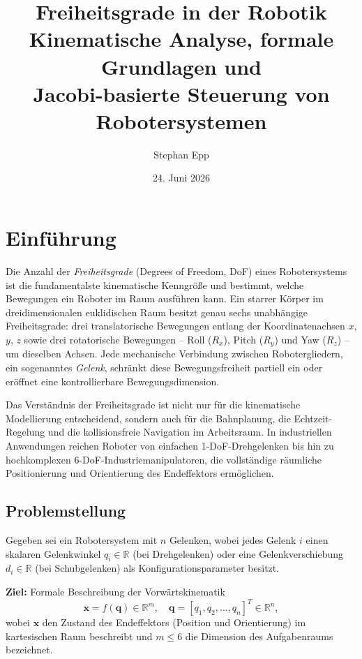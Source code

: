 ﻿\documentclass[a4paper,12pt]{article}
\title{\textbf{Freiheitsgrade in der Robotik}\\
\large Kinematische Analyse, formale Grundlagen und \\
Jacobi-basierte Steuerung von Robotersystemen}
\author{Stephan Epp}
\date{24. Juni 2026}
\theoremstyle{definition}
\begin{document}
\maketitle
\tableofcontents
\newpage

\section{Einführung}

Die Anzahl der \emph{Freiheitsgrade} (Degrees of Freedom, DoF) eines Robotersystems ist die fundamentalste kinematische Kenngröße und bestimmt, welche Bewegungen ein Roboter im Raum ausführen kann. Ein starrer Körper im dreidimensionalen euklidischen Raum besitzt genau sechs unabhängige Freiheitsgrade: drei translatorische Bewegungen entlang der Koordinatenachsen $x$, $y$, $z$ sowie drei rotatorische Bewegungen -- Roll ($R_x$), Pitch ($R_y$) und Yaw ($R_z$) -- um dieselben Achsen. Jede mechanische Verbindung zwischen Robotergliedern, ein sogenanntes \emph{Gelenk}, schränkt diese Bewegungsfreiheit partiell ein oder eröffnet eine kontrollierbare Bewegungsdimension.

Das Verständnis der Freiheitsgrade ist nicht nur für die kinematische Modellierung entscheidend, sondern auch für die Bahnplanung, die Echtzeit-Regelung und die kollisionsfreie Navigation im Arbeitsraum. In industriellen Anwendungen reichen Roboter von einfachen 1-DoF-Drehgelenken bis hin zu hochkomplexen 6-DoF-Industriemanipulatoren, die vollständige räumliche Positionierung und Orientierung des Endeffektors ermöglichen.

\subsection{Problemstellung}

Gegeben sei ein Robotersystem mit $n$ Gelenken, wobei jedes Gelenk $i$ einen skalaren Gelenkwinkel $q_i \in \mathbb{R}$ (bei Drehgelenken) oder eine Gelenkverschiebung $d_i \in \mathbb{R}$ (bei Schubgelenken) als Konfigurationsparameter besitzt.

\textbf{Ziel:} Formale Beschreibung der Vorwärtskinematik
\[
	\mathbf{x} = f(\mathbf{q}) \in \mathbb{R}^m,
	\quad
	\mathbf{q} = [q_1, q_2, \ldots, q_n]^T \in \mathbb{R}^n,
\]
wobei $\mathbf{x}$ den Zustand des Endeffektors (Position und Orientierung) im kartesischen Raum beschreibt und $m \leq 6$ die Dimension des Aufgabenraums bezeichnet.
\end{document}
